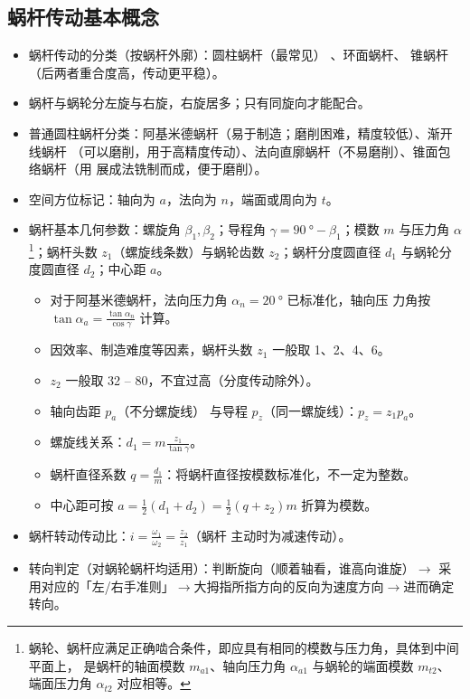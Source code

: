\documentclass[12pt,a4paper]{article}
\newcommand{\tightlist}{\setlength{\parskip}{0pt}\setlength{\itemsep}{0pt}}
\newcommand{\hint}[1]{\textsf{（#1）}}
\newcommand{\minor}[1]{{\color{gray} #1}}
\newcommand{\then}{$\to$}
\begin{document}
\subsection{蜗杆传动基本概念}
\begin{itemize}\tightlist
    \item 蜗杆传动的分类\hint{按蜗杆外廓}：圆柱蜗杆\hint{最常见}\minor{、环面蜗杆、
    锥蜗杆\hint{后两者重合度高，传动更平稳}}。
    \item 蜗杆与蜗轮分左旋与右旋，右旋居多；只有同旋向才能配合。
    \item 普通圆柱蜗杆分类：阿基米德蜗杆\hint{易于制造；磨削困难，精度较低}、渐开线蜗杆
    \hint{可以磨削，用于高精度传动}、法向直廓蜗杆\hint{不易磨削}、锥面包络蜗杆\hint{用
    展成法铣制而成，便于磨削}。
    \item 空间方位标记：轴向为 $a$，法向为 $n$，端面或周向为 $t$。
    \item 蜗杆基本几何参数：螺旋角 $\beta_1,\beta_2$；导程角 $\gamma=\SI{90}\degree
    -\beta_1$；模数 $m$ 与压力角 $\alpha$
    \footnote{蜗轮、蜗杆应满足正确啮合条件，即应具有相同的模数与压力角，具体到中间平面上，
    是蜗杆的轴面模数 $m_{a1}$、轴向压力角 $\alpha_{a1}$ 与蜗轮的端面模数 $m_{t2}$、
    端面压力角 $\alpha_{t2}$ 对应相等。}；蜗杆头数 $z_1$\hint{螺旋线条数}与蜗轮齿数
    $z_2$；蜗杆分度圆直径 $d_1$ 与蜗轮分度圆直径 $d_2$；中心距 $a$。
    \begin{itemize}\tightlist
        \item 对于阿基米德蜗杆，法向压力角 $\alpha_n=\SI{20}\degree$ 已标准化，轴向压
        力角按 $\tan\alpha_a=\frac{\tan\alpha_n}{\cos\gamma}$ 计算。
        \item 因效率、制造难度等因素，蜗杆头数 $z_1$ 一般取 1、2、4、6。
        \item $z_2$ 一般取 32 -- 80，不宜过高\hint{分度传动除外}。
        \item 轴向齿距 $p_a$\hint{不分螺旋线} 与导程 $p_z$\hint{同一螺旋线}：$p_z=z_1p_a$。
        \item 螺旋线关系：$d_1=m\frac{z_1}{\tan\gamma}$。
        \item 蜗杆直径系数 $q=\frac{d_1}{m}$：将蜗杆直径按模数标准化，不一定为整数。
        \item 中心距可按 $a=\frac12(d_1+d_2)=\frac12(q+z_2)m$ 折算为模数。
    \end{itemize}
    \item 蜗杆转动传动比：$i=\frac{\omega_1}{\omega_2}=\frac{z_2}{z_1}$\hint{蜗杆
    主动时为减速传动}。
    \item 转向判定\hint{对蜗轮蜗杆均适用}：判断旋向\hint{顺着轴看，谁高向谁旋}\then
    采用对应的「左/右手准则」\then 大拇指所指方向的反向为速度方向\then 进而确定转向。
\end{itemize}
\end{document}
